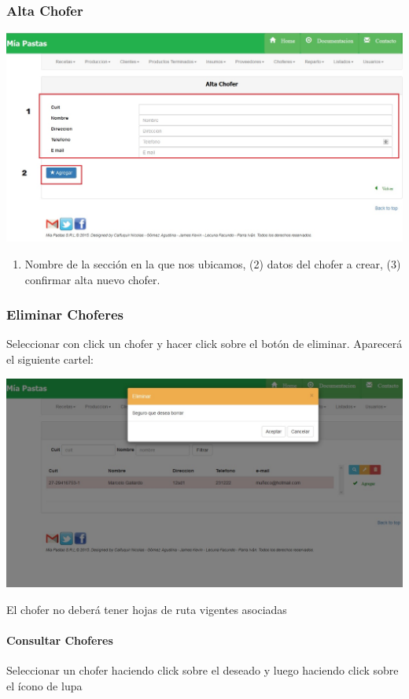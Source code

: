 \documentclass[letterpaper,10pt,english]{sphinxmanual}
\begin{document}
\subsubsection{Alta Chofer}
\label{choferes:alta-chofer}
\includegraphics{chofer_alta.jpg}
\begin{enumerate}
\item {} 
Nombre de la sección en la que nos ubicamos, (2) datos del chofer a crear, (3) confirmar alta nuevo chofer.

\end{enumerate}


\subsubsection{Eliminar Choferes}
\label{choferes:eliminar-choferes}
Seleccionar con click un chofer y hacer click sobre el botón de eliminar. Aparecerá el siguiente cartel:

\includegraphics{chofer_eliminar.jpg}

El chofer no deberá tener hojas de ruta vigentes asociadas


\paragraph{{}Consultar Choferes}
\label{choferes consultar:consultar-choferes}\label{choferes consultar::doc}
Seleccionar un chofer haciendo click sobre el deseado y luego haciendo click sobre el ícono de lupa
\end{document}
